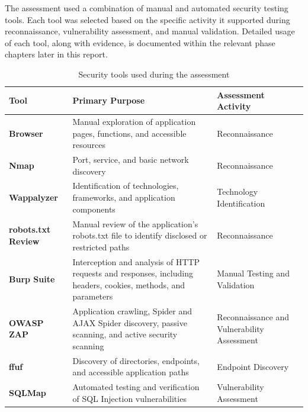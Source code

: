The assessment used a combination of manual and automated security
testing tools. Each tool was selected based on the specific activity
it supported during reconnaissance, vulnerability assessment, and
manual validation. Detailed usage of each tool, along with evidence,
is documented within the relevant phase chapters later in this
report.

\begin{table}[!htb]
\small
\centering
\begin{tabularx}{\textwidth}{>{\bfseries}p{}
                                X
                                p{}}
\toprule
Tool & Primary Purpose & Assessment Activity \\
\midrule

Browser &
Manual exploration of application pages, functions, and accessible
resources &
Reconnaissance \\

Nmap &
Port, service, and basic network discovery &
Reconnaissance \\

Wappalyzer &
Identification of technologies, frameworks, and application
components &
Technology Identification \\

robots.txt Review &
Manual review of the application's robots.txt file to identify
disclosed or restricted paths &
Reconnaissance \\

Burp Suite &
Interception and analysis of HTTP requests and responses, including
headers, cookies, methods, and parameters &
Manual Testing and Validation \\

OWASP ZAP &
Application crawling, Spider and AJAX Spider discovery, passive
scanning, and active security scanning &
Reconnaissance and Vulnerability Assessment \\

ffuf &
Discovery of directories, endpoints, and accessible application
paths &
Endpoint Discovery \\

SQLMap &
Automated testing and verification of SQL Injection vulnerabilities &
Vulnerability Assessment \\

\bottomrule
\end{tabularx}
\caption{Security tools used during the assessment}
\label{tab:recon-tools}
\end{table}